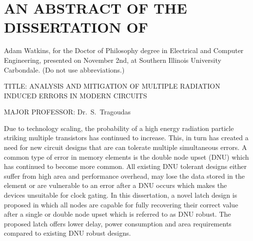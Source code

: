 


\chapter*{AN ABSTRACT OF THE DISSERTATION OF}

Adam Watkins, for the Doctor of Philosophy degree in Electrical and Computer Engineering,
presented on November 2nd, at Southern Illinois University Carbondale.
(Do not use abbreviations.)

\vspace{14pt}
\noindent
TITLE: ANALYSIS AND MITIGATION OF MULTIPLE RADIATION INDUCED ERRORS IN MODERN CIRCUITS

\vspace{14pt}

\noindent
MAJOR PROFESSOR: Dr.\ S.\ Tragoudas

\vspace{14pt}

Due to technology scaling, the probability of a high energy radiation particle striking multiple transistors has continued to increase. This, in turn has created a need for new circuit designs that are can tolerate multiple simultaneous errors. A common type of error in memory elements is the double node upset (DNU) which has continued to become more common. All existing DNU tolerant designs either suffer from high area and performance overhead, may lose the data stored in the element or are vulnerable to an error after a DNU occurs which makes the devices unsuitable for clock gating. In this dissertation, a novel latch design is proposed in which all nodes are capable for fully recovering their correct value after a single or double node upset which is referred to as DNU robust. The proposed latch offers lower delay, power consumption and area requirements compared to existing DNU robust designs.


\newpage

